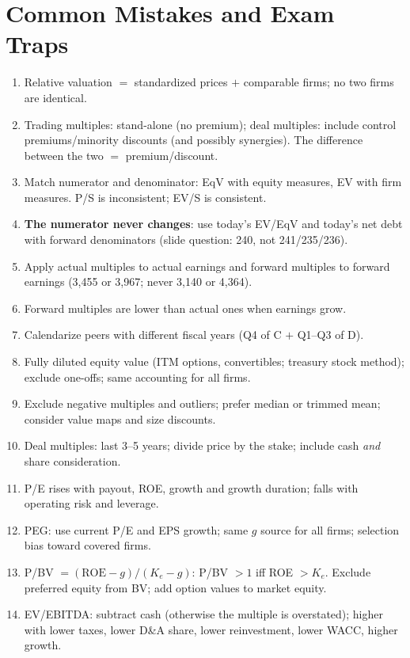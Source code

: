 \section{Common Mistakes and Exam Traps}
\begin{trapbox}
\begin{enumerate}[leftmargin=*]
  \item Relative valuation $=$ standardized prices $+$ comparable firms; no two firms are identical.
  \item Trading multiples: stand-alone (no premium); deal multiples: include control premiums/minority discounts (and possibly synergies). The difference between the two $=$ premium/discount.
  \item Match numerator and denominator: EqV with equity measures, EV with firm measures. P/S is inconsistent; EV/S is consistent.
  \item \textbf{The numerator never changes}: use today's EV/EqV and today's net debt with forward denominators (slide question: 240, not 241/235/236).
  \item Apply actual multiples to actual earnings and forward multiples to forward earnings (3,455 or 3,967; never 3,140 or 4,364).
  \item Forward multiples are lower than actual ones when earnings grow.
  \item Calendarize peers with different fiscal years (Q4 of C $+$ Q1--Q3 of D).
  \item Fully diluted equity value (ITM options, convertibles; treasury stock method); exclude one-offs; same accounting for all firms.
  \item Exclude negative multiples and outliers; prefer median or trimmed mean; consider value maps and size discounts.
  \item Deal multiples: last 3--5 years; divide price by the stake; include cash \emph{and} share consideration.
  \item P/E rises with payout, ROE, growth and growth duration; falls with operating risk and leverage.
  \item PEG: use current P/E and EPS growth; same $g$ source for all firms; selection bias toward covered firms.
  \item P/BV $=(\text{ROE}-g)/(K_e-g)$: P/BV $>1$ iff ROE $>K_e$. Exclude preferred equity from BV; add option values to market equity.
  \item EV/EBITDA: subtract cash (otherwise the multiple is overstated); higher with lower taxes, lower D\&A share, lower reinvestment, lower WACC, higher growth.

\end{enumerate}
\end{trapbox}
